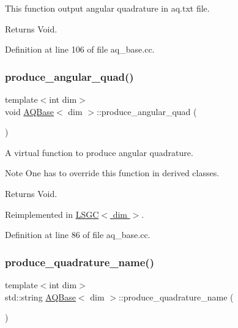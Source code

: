 This function output angular quadrature in aq.\+txt file.

\begin{DoxyReturn}{Returns}
Void. 
\end{DoxyReturn}


Definition at line 106 of file aq\+\_\+base.\+cc.

\mbox{\label{class_a_q_base_a16c7871be0da6c112f547f39d50258fd}} 
\subsubsection{\texorpdfstring{produce\+\_\+angular\+\_\+quad()}{produce\_angular\_quad()}}
{\footnotesize\ttfamily template$<$int dim$>$ \\
void \hyperlink{class_a_q_base}{A\+Q\+Base}$<$ dim $>$\+::produce\+\_\+angular\+\_\+quad (\begin{DoxyParamCaption}{ }\end{DoxyParamCaption})\hspace{0.3cm}{\ttfamily [virtual]}}

A virtual function to produce angular quadrature.

\begin{DoxyNote}{Note}
One has to override this function in derived classes. 
\end{DoxyNote}
\begin{DoxyReturn}{Returns}
Void. 
\end{DoxyReturn}


Reimplemented in \hyperlink{class_l_s_g_c_a1d135fb9ca12a9b65b8cc397479fc4d7}{L\+S\+G\+C$<$ dim $>$}.



Definition at line 86 of file aq\+\_\+base.\+cc.

\mbox{\label{class_a_q_base_a4ae1370033705c82d08686fd651ad6e8}} 
\subsubsection{\texorpdfstring{produce\+\_\+quadrature\+\_\+name()}{produce\_quadrature\_name()}}
{\footnotesize\ttfamily template$<$int dim$>$ \\
std\+::string \hyperlink{class_a_q_base}{A\+Q\+Base}$<$ dim $>$\+::produce\+\_\+quadrature\+\_\+name (\begin{DoxyParamCaption}{ }\end{DoxyParamCaption})\hspace{0.3cm}{\ttfamily [private]}}


